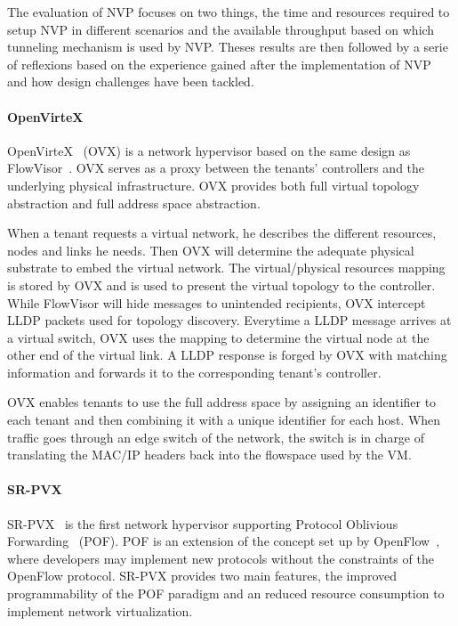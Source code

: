 The evaluation of NVP focuses on two things, the time and resources required to setup NVP in different scenarios and the available throughput based on which tunneling mechanism is used by NVP. Theses results are then followed by a serie of reflexions based on the experience gained after the implementation of NVP and how design challenges have been tackled.

\paragraph{OpenVirteX}
OpenVirteX~\cite{OpenVirteX-Al-Shabibi2014} (OVX) is a network hypervisor based on the same design as FlowVisor~\cite{FlowVisor-Sherwood2009}. OVX serves as a proxy between the tenants' controllers and the underlying physical infrastructure. OVX provides both full virtual topology abstraction and full address space abstraction. 

When a tenant requests a virtual network, he describes the different resources, nodes and links he needs.
Then OVX will determine the adequate physical substrate to embed the virtual network.
The virtual/physical resources mapping is stored by OVX and is used to present the virtual topology to the controller.
While FlowVisor will hide messages to unintended recipients, OVX intercept LLDP packets used for topology discovery. Everytime a LLDP message arrives at a virtual switch, OVX uses the mapping to determine the virtual node at the other end of the virtual link. A LLDP response is forged by OVX with matching information and forwards it to the corresponding tenant's controller.

OVX enables tenants to use the full address space by assigning an identifier to each tenant and then combining it with a unique identifier for each host. When traffic goes through an edge switch of the network, the switch is in charge of translating the MAC/IP headers back into the flowspace used by the VM.

\paragraph{SR-PVX}
SR-PVX~\cite{PVX-Li2017} is the first network hypervisor supporting Protocol Oblivious Forwarding~\cite{pof-song2013} (POF). POF is an extension of the concept set up by OpenFlow~\cite{Openflow-McKeown2008}, where developers may implement new protocols without the constraints of the OpenFlow protocol.
SR-PVX provides two main features, the improved programmability of the POF paradigm and an reduced resource consumption to implement network virtualization.

